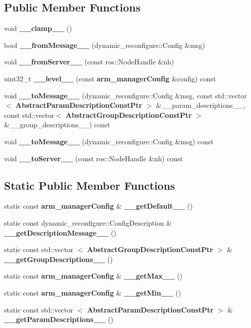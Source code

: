\subsection*{\-Public \-Member \-Functions}
\begin{DoxyCompactItemize}
\item 
void {\bf \-\_\-\-\_\-clamp\-\_\-\-\_\-} ()
\item 
bool {\bf \-\_\-\-\_\-from\-Message\-\_\-\-\_\-} (dynamic\-\_\-reconfigure\-::\-Config \&msg)
\item 
void {\bf \-\_\-\-\_\-from\-Server\-\_\-\-\_\-} (const ros\-::\-Node\-Handle \&nh)
\item 
uint32\-\_\-t {\bf \-\_\-\-\_\-level\-\_\-\-\_\-} (const {\bf arm\-\_\-manager\-Config} \&config) const 
\item 
void {\bf \-\_\-\-\_\-to\-Message\-\_\-\-\_\-} (dynamic\-\_\-reconfigure\-::\-Config \&msg, const std\-::vector$<$ {\bf \-Abstract\-Param\-Description\-Const\-Ptr} $>$ \&\-\_\-\-\_\-param\-\_\-descriptions\-\_\-\-\_\-, const std\-::vector$<$ {\bf \-Abstract\-Group\-Description\-Const\-Ptr} $>$ \&\-\_\-\-\_\-group\-\_\-descriptions\-\_\-\-\_\-) const 
\item 
void {\bf \-\_\-\-\_\-to\-Message\-\_\-\-\_\-} (dynamic\-\_\-reconfigure\-::\-Config \&msg) const 
\item 
void {\bf \-\_\-\-\_\-to\-Server\-\_\-\-\_\-} (const ros\-::\-Node\-Handle \&nh) const 
\end{DoxyCompactItemize}
\subsection*{\-Static \-Public \-Member \-Functions}
\begin{DoxyCompactItemize}
\item 
static const {\bf arm\-\_\-manager\-Config} \& {\bf \-\_\-\-\_\-get\-Default\-\_\-\-\_\-} ()
\item 
static const \*
dynamic\-\_\-reconfigure\-::\-Config\-Description \& {\bf \-\_\-\-\_\-get\-Description\-Message\-\_\-\-\_\-} ()
\item 
static const std\-::vector\*
$<$ {\bf \-Abstract\-Group\-Description\-Const\-Ptr} $>$ \& {\bf \-\_\-\-\_\-get\-Group\-Descriptions\-\_\-\-\_\-} ()
\item 
static const {\bf arm\-\_\-manager\-Config} \& {\bf \-\_\-\-\_\-get\-Max\-\_\-\-\_\-} ()
\item 
static const {\bf arm\-\_\-manager\-Config} \& {\bf \-\_\-\-\_\-get\-Min\-\_\-\-\_\-} ()
\item 
static const std\-::vector\*
$<$ {\bf \-Abstract\-Param\-Description\-Const\-Ptr} $>$ \& {\bf \-\_\-\-\_\-get\-Param\-Descriptions\-\_\-\-\_\-} ()
\end{DoxyCompactItemize}

